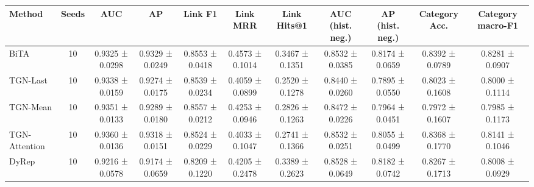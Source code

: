 \begin{tabular}{lcccccccccc}
\toprule
Method & Seeds & AUC & AP & Link F1 & Link MRR & Link Hits@1 & AUC (hist. neg.) & AP (hist. neg.) & Category Acc. & Category macro-F1 \\
\midrule
BiTA & 10 & 0.9325 ± 0.0298 & 0.9329 ± 0.0249 & 0.8553 ± 0.0418 & 0.4573 ± 0.1014 & 0.3467 ± 0.1351 & 0.8532 ± 0.0385 & 0.8174 ± 0.0659 & 0.8392 ± 0.0789 & 0.8281 ± 0.0907 \\
TGN-Last & 10 & 0.9338 ± 0.0159 & 0.9274 ± 0.0175 & 0.8539 ± 0.0234 & 0.4059 ± 0.0899 & 0.2520 ± 0.1278 & 0.8440 ± 0.0260 & 0.7895 ± 0.0550 & 0.8023 ± 0.1608 & 0.8000 ± 0.1114 \\
TGN-Mean & 10 & 0.9351 ± 0.0133 & 0.9289 ± 0.0180 & 0.8557 ± 0.0212 & 0.4253 ± 0.0946 & 0.2826 ± 0.1263 & 0.8472 ± 0.0226 & 0.7964 ± 0.0451 & 0.7972 ± 0.1607 & 0.7985 ± 0.1173 \\
TGN-Attention & 10 & 0.9360 ± 0.0136 & 0.9318 ± 0.0151 & 0.8524 ± 0.0229 & 0.4033 ± 0.1047 & 0.2741 ± 0.1366 & 0.8532 ± 0.0251 & 0.8055 ± 0.0499 & 0.8368 ± 0.1770 & 0.8141 ± 0.1046 \\
DyRep & 10 & 0.9216 ± 0.0578 & 0.9174 ± 0.0659 & 0.8209 ± 0.1220 & 0.4205 ± 0.2478 & 0.3389 ± 0.2623 & 0.8528 ± 0.0649 & 0.8182 ± 0.0742 & 0.8267 ± 0.1713 & 0.8008 ± 0.0929 \\
\bottomrule
\end{tabular}
